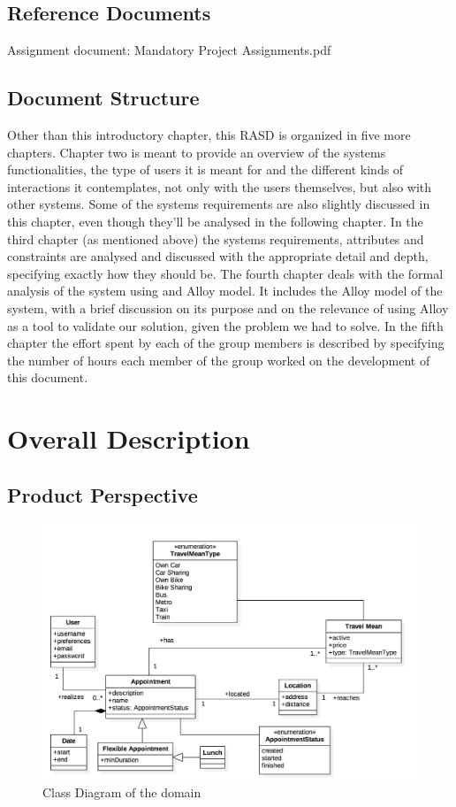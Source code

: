 \documentclass[12pt]{article}
\begin{document}
\subsection{Reference Documents}
Assignment document: Mandatory Project Assignments.pdf

\subsection{Document Structure}
Other than this introductory chapter, this RASD is organized in five more chapters. Chapter two is meant to provide an overview of the systems functionalities, the type of users it is meant for and the different kinds of interactions it contemplates, not only with the users themselves, but also with other systems. Some of the systems requirements are also slightly discussed in this chapter, even though they’ll be analysed in the following chapter. In the third chapter (as mentioned above) the systems requirements, attributes and constraints are analysed and discussed with the appropriate detail and depth, specifying exactly how they should be.
The fourth chapter deals with the formal analysis of the system using and Alloy model. It includes the Alloy model of the system, with a brief discussion on its purpose and on the relevance of using Alloy as a tool to validate our solution, given the problem we had to solve.
In the fifth chapter the effort spent by each of the group members is described by specifying the number of hours each member of the group worked on the development of this document.

\section{Overall Description}

\subsection{Product Perspective}
    \begin{figure}[ht]
        \includegraphics[scale=0.52]{domainModel.png}
        \caption{Class Diagram of the domain}
    \label{fig:domainModel}
    \end{figure}
    
\end{document}
